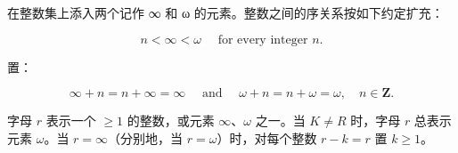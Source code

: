 
在整数集上添入两个记作 ∞ 和 ω 的元素。整数之间的序关系按如下约定扩充：

\[
n <   \infty <   \omega \quad \text { for   every   integer } n.
\]

置：

\[
\infty + n = n + \infty = \infty \quad \text { and } \quad \omega + n = n + \omega = \omega , \quad n \in \mathbf {Z}.
\]

字母 \(r\) 表示一个 \(\geqslant 1\) 的整数，或元素 \(\infty\)、\(\omega\) 之一。当 \(K \neq R\) 时，字母 \(r\) 总表示元素 \(\omega\)。当 \(r = \infty\)（分别地，当 \(r = \omega\)）时，对每个整数 \(r - k = r\) 置 \(k \geqslant 1\)。

